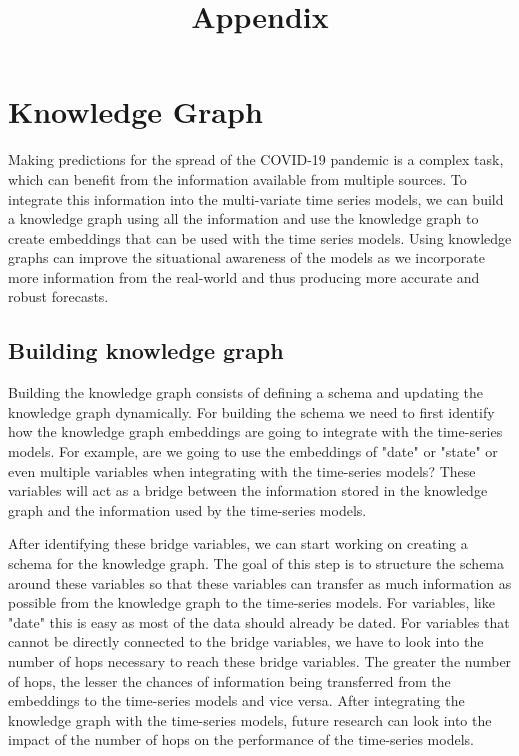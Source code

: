 \documentclass[11pt,twocolumn,letterpaper]{article}
\begin{document}
\title{Appendix}

\maketitle
\thispagestyle{empty}

\section{Knowledge Graph}
Making predictions for the spread of the COVID-19 pandemic is a complex task, which can benefit from the information available from multiple sources. To integrate this information into the multi-variate time series models, we can build a knowledge graph using all the information and use the knowledge graph to create embeddings that can be used with the time series models. Using knowledge graphs can improve the situational awareness of the models as we incorporate more information from the real-world and thus producing more accurate and robust forecasts.

\subsection{Building knowledge graph}
Building the knowledge graph consists of defining a schema and updating the knowledge graph dynamically. For building the schema we need to first identify how the knowledge graph embeddings are going to integrate with the time-series models. For example, are we going to use the embeddings of "date" or "state" or even multiple variables when integrating with the time-series models? These variables will act as a bridge between the information stored in the knowledge graph and the information used by the time-series models.

After identifying these bridge variables, we can start working on creating a schema for the knowledge graph. The goal of this step is to structure the schema around these variables so that these variables can transfer as much information as possible from the knowledge graph to the time-series models. For variables, like "date" this is easy as most of the data should already be dated. For variables that cannot be directly connected to the bridge variables, we have to look into the number of hops necessary to reach these bridge variables. The greater the number of hops, the lesser the chances of information being transferred from the embeddings to the time-series models and vice versa. After integrating the knowledge graph with the time-series models, future research can look into the impact of the number of hops on the performance of the time-series models.
\end{document}
